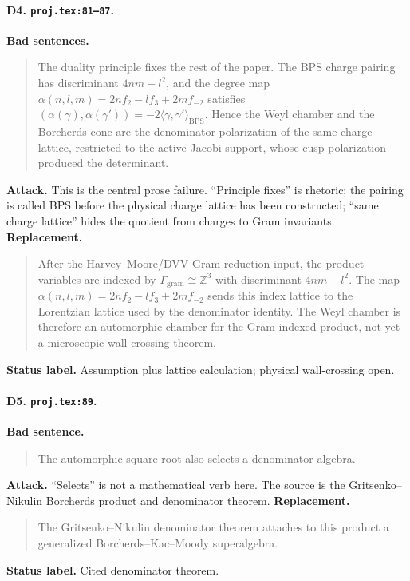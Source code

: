 \paragraph{D4. \texttt{proj.tex:81--87}.}
\textbf{Bad sentences.}
\begin{quote}\small
The duality principle fixes the rest of the paper.  The BPS charge
pairing has discriminant \(4nm-l^2\), and the degree map
\(\alpha(n,l,m)=2nf_2-lf_3+2mf_{-2}\) satisfies
\((\alpha(\gamma),\alpha(\gamma'))=-2\langle\gamma,\gamma'\rangle_{\mathrm{BPS}}\).
Hence the Weyl chamber and the Borcherds cone are the denominator
polarization of the same charge lattice, restricted to the active
Jacobi support, whose cusp polarization produced the determinant.
\end{quote}
\textbf{Attack.}
This is the central prose failure.  ``Principle fixes'' is rhetoric; the
pairing is called BPS before the physical charge lattice has been
constructed; ``same charge lattice'' hides the quotient from charges to
Gram invariants.
\textbf{Replacement.}
\begin{quote}\small
After the Harvey--Moore/DVV Gram-reduction input, the product variables
are indexed by \(\Gamma_{\mathrm{gram}}\cong\mathbb Z^3\) with
discriminant \(4nm-l^2\).  The map
\(\alpha(n,l,m)=2nf_2-lf_3+2mf_{-2}\) sends this index lattice to the
Lorentzian lattice used by the denominator identity.  The Weyl chamber is
therefore an automorphic chamber for the Gram-indexed product, not yet a
microscopic wall-crossing theorem.
\end{quote}
\textbf{Status label.} Assumption plus lattice calculation; physical
wall-crossing open.

\paragraph{D5. \texttt{proj.tex:89}.}
\textbf{Bad sentence.}
\begin{quote}\small
The automorphic square root also selects a denominator algebra.
\end{quote}
\textbf{Attack.}
``Selects'' is not a mathematical verb here.  The source is the
Gritsenko--Nikulin Borcherds product and denominator theorem.
\textbf{Replacement.}
\begin{quote}\small
The Gritsenko--Nikulin denominator theorem attaches to this product a
generalized Borcherds--Kac--Moody superalgebra.
\end{quote}
\textbf{Status label.} Cited denominator theorem.

